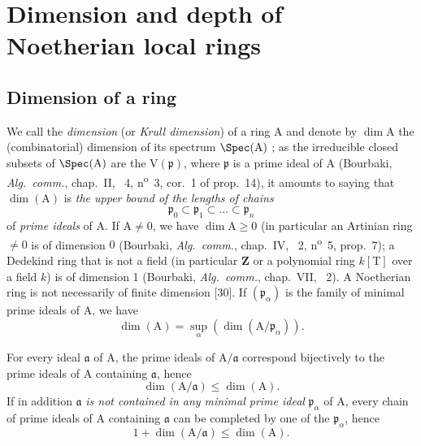 \section{Dimension and depth of Noetherian local rings}
\label{section:0.16}

\subsection{Dimension of a ring}
\label{subsection:0.16.1}
\label{0.16.1}


\begin{env}[16.1.1]
\label{0.16.1.1}
We call the \emph{dimension} (or \emph{Krull dimension}) of a ring $\mathrm{A}$ and denote by $\dim\mathrm{A}$ the (combinatorial) dimension of its spectrum $\Spec(\mathrm{A})$ ; as the irreducible closed subsets of $\Spec(\mathrm{A})$ are the $\mathrm{V}(\mathfrak{p})$, where $\mathfrak{p}$ is a prime ideal of $\mathrm{A}$ (Bourbaki, \emph{Alg.~comm.}, chap.~II, \textsection~4, n\textsuperscript{o}~3, cor.~1 of prop.~14), it amounts to saying that $\dim(\mathrm{A})$ is \emph{the upper bound of the lengths of chains} 
\[
  \mathfrak{p}_0\subset\mathfrak{p}_1\subset\ldots\subset\mathfrak{p}_n
\]
of \emph{prime ideals} of $\mathrm{A}$.
If $\mathrm{A}\neq 0$, we have $\dim\mathrm{A}\geq 0$ (in particular an Artinian ring $\neq 0$ is of dimension $0$ (Bourbaki, \emph{Alg.~comm.}, chap.~IV, \textsection~2, n\textsuperscript{o}~5, prop.~7); a Dedekind ring that is not a field (in particular $\mathbf{Z}$ or a polynomial ring $k[\mathrm{T}]$ over a field $k$) is of dimension 1 (Bourbaki, \emph{Alg.~comm.}, chap.~VII, \textsection~2).
A Noetherian ring is not necessarily of finite dimension [30].
If $(\mathfrak{p}_\alpha)$ is the family of minimal prime ideals of $\mathrm{A}$, we have 
\begin{equation}
\label{0.16.1.1.1}
\tag{16.1.1.1}
  \dim(\mathrm{A})=\sup_\alpha(\dim(\mathrm{A}/\mathfrak{p}_\alpha)).
\end{equation}
\end{env}

\begin{env}[16.1.2]
\label{0.16.1.2}
For every ideal $\mathfrak{a}$ of $\mathrm{A}$, the prime ideals of $\mathrm{A}/\mathfrak{a}$ correspond bijectively to the prime ideals of $\mathrm{A}$ containing $\mathfrak{a}$, hence
\begin{equation}
\label{0.16.1.2.1}
\tag{16.1.2.1}
  \dim(\mathrm{A}/\mathfrak{a})\leq\dim(\mathrm{A}).
\end{equation}
If in addition $\mathfrak{a}$ \emph{is not contained in any minimal prime ideal} $\mathfrak{p}_\alpha$ of $\mathrm{A}$, every chain of prime ideals of $\mathrm{A}$ containing $\mathfrak{a}$ can be completed by one of the $\mathfrak{p}_\alpha$, hence
\begin{equation}
\label{0.16.1.2.2}
\tag{16.1.2.2}
  1+\dim(\mathrm{A}/\mathfrak{a})\leq\dim(\mathrm{A}).
\end{equation}
\end{env}

